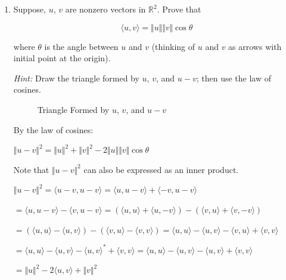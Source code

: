 \documentclass[fleqn]{article}
\makeatletter
\newenvironment{equationCenter}{\@fleqnfalse\begin{equation*}}{\end{equation*}}
\makeatother
\begin{document}
\begin{enumerate}[nolistsep]
		\item Suppose, $u$, $v$ are nonzero vectors in $\mathbb{R}^2$. Prove that
		
			\begin{equationCenter}
				\langle u,v \rangle = \Vert u \Vert \Vert v \Vert \cos \theta
			\end{equationCenter}
			
			where $\theta$ is the angle between $u$ and $v$ (thinking of $u$ and $v$ as arrows with initial point at the origin).
			
			\textit{Hint:} Draw the triangle formed by $u$, $v$, and $u-v$; then use the law of cosines.
			
			\begin{figure}[H]				
			\centerline{}
			\caption{Triangle Formed by $u$, $v$, and $u - v$}
			\label{triangle_prob2}
			\end{figure}
			
			By the law of cosines:
			
			${\Vert u - v \Vert}^2 = {\Vert u \Vert}^2 + {\Vert v \Vert}^2  - 2{\Vert u \Vert}{\Vert v \Vert}\cos\theta$
			
			Note that ${\Vert u - v \Vert}^2$ can also be expressed as an inner product.
			
			${\Vert u - v \Vert}^2 = \langle u - v, u - v \rangle = \langle u, u - v \rangle + \langle -v, u-v \rangle$
			
			$ = \langle u, u - v \rangle - \langle v, u-v \rangle = (\langle u, u \rangle + \langle u, -v \rangle) - (\langle v, u \rangle + \langle v, -v\rangle)$
			
			$ = (\langle u, u \rangle - \langle u, v \rangle) - (\langle v, u \rangle - \langle v, v\rangle) = \langle u, u \rangle - \langle u, v \rangle - \langle v, u \rangle + \langle v, v\rangle$
			
			$ = \langle u, u \rangle - \langle u, v \rangle - {\langle u, v \rangle}^* + \langle v, v\rangle = \langle u, u \rangle - \langle u, v \rangle - {\langle u, v \rangle} + \langle v, v\rangle$
			
			$ = {\Vert u \Vert}^2 - 2\langle u, v \rangle + {\Vert v \Vert}^2$
			

\end{enumerate}
\end{document}
